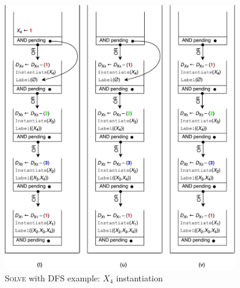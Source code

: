 \documentclass{ws-ijait}
\begin{document}
\begin{enumerate}
\begin{figure}
  \centering
  \includegraphics[width=0.9\textwidth]{figures/stacks/tuv}
  \caption{\textsc{Solve} with DFS example: $X_4$
           instantiation\label{tuv}}
\end{figure}


\end{enumerate}
\end{document}
